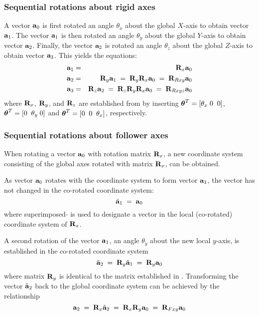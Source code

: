 \subsubsection{Sequential rotations about rigid axes}

A vector ${\bf a}_0$ is first rotated an angle $\theta_x$ about the global
$X$-axis to obtain vector ${\bf a}_1$.
The vector ${\bf a}_1$ is then rotated an angle $\theta_y$ about the global
$Y$-axis to obtain vector ${\bf a}_2$.
Finally, the vector ${\bf a}_2$ is rotated an angle $\theta_z$ about the global
$Z$-axis to obtain vector ${\bf a}_3$.
This yields the equations:
%
\begin{eqnarray}
{\bf a}_1 &=& {\bf R}_x{\bf a}_0 \\
{\bf a}_2 &=& {\bf R}_y{\bf a}_1 \;=\;
{\bf R}_y{\bf R}_x{\bf a}_0 \;=\; {\bf R}_{Rxy}{\bf a}_0
\label{eqF:RigAxisRot} \\
{\bf a}_3 &=& {\bf R}_z{\bf a}_2 \;=\;
{\bf R}_z{\bf R}_y{\bf R}_x{\bf a}_0 \;=\; {\bf R}_{Rxyz}{\bf a}_0
\label{eqF:RigidXYZ}
\end{eqnarray}
%
where ${\bf R}_x$, ${\bf R}_y$, and ${\bf R}_z$ are established
from  by inserting ${\boldsymbol{\theta}}^T = [\theta_x\;0\;\;0]$,
${\boldsymbol{\theta}}^T = [0\;\;\theta_y\;0]$ and ${\boldsymbol{\theta}}^T = [0\;\;0\;\;\theta_x]$,
respectively.

\subsubsection{Sequential rotations about follower axes}

When rotating a vector ${\bf a}_0$ with rotation matrix ${\bf R}_x$,
a new coordinate system consisting of the global axes rotated with matrix
${\bf R}_x$, can be obtained.


\noindent
As vector ${\bf a}_0$ rotates with the coordinate system to form vector
${\bf a}_1$, the vector has not changed in the co-rotated coordinate system:
%
\begin{equation}
\tilde{\bf a}_1 \;=\; {\bf a}_0
\end{equation}
%
where superimposed $\tilde{}$ is used to designate a vector in the local
(co-rotated) coordinate system of ${\bf R}_x$.

A second rotation of the vector ${\bf a}_1$, an angle $\theta_y$ about the new
local $y$-axis, is established in the co-rotated coordinate system
%
\begin{equation}
\tilde{\bf a}_2 \;=\; {\bf R}_y\tilde{\bf a}_1 \;=\; {\bf R}_y{\bf a}_0
\end{equation}
%
where matrix ${\bf R}_y$ is identical to the matrix established
in .
Transforming the vector $\tilde{\bf a}_2$ back to the global coordinate system
can be achieved by the relationship
%
\begin{equation}
{\bf a}_2 \;=\; {\bf R}_x\tilde{\bf a}_2 \;=\;
{\bf R}_x{\bf R}_y{\bf a}_0 \;=\; {\bf R}_{Fxy}{\bf a}_0
\end{equation}

